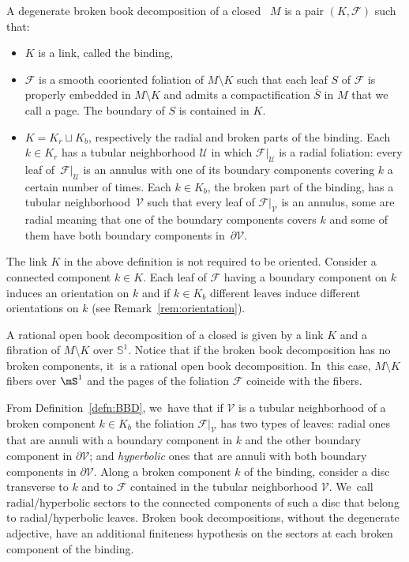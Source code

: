 \begin{defi}\label{defn:BBD}
A degenerate broken book decomposition of a closed \threemanifold~$M$ is a pair $(K,\mathcal{F})$ such that:
\begin{itemize}
\item
$K$ is a link, called the binding,
\item
$\mathcal{F}$ is a smooth cooriented foliation of $M\setminus K$ such that each leaf $S$ of $\mathcal{F}$ is properly embedded in $M\setminus K$ and admits a compactification $\overline{S}$ in $M$ that we call a page. The boundary of $S$ is contained in $K$.
\item
$K=K_r\sqcup K_b$, respectively the radial and broken parts of the binding. Each $k\in K_r$ has a tubular neighborhood $\mathcal{U}$ in which $\mathcal{F}|_{\mathcal U}$ is a radial foliation: every leaf of~$\mathcal{F}|_{\mathcal U}$ is an annulus with one of its boundary components covering $k$ a certain number of times. Each $k\in K_b$, the broken part of the binding, has a tubular neighborhood~$\mathcal{V}$ such that every leaf of $\mathcal{F}|_{\mathcal{V}}$ is an annulus, some are radial meaning that one of the boundary components covers $k$ and some of them have both boundary components in~$\partial \mathcal{V}$.
\end{itemize}
\end{defi}

The link $K$ in the above definition is not required to be oriented. Consider a connected component $k\in K$. Each leaf of $\mathcal{F}$ having a boundary component on $k$ induces an orientation on $k$ and if $k\in K_b$ different leaves induce different orientations on $k$ (see Remark~\ref{rem:orientation}).

A rational open book decomposition of a closed \threemanifold is given by a link $K$ and a fibration of $M\setminus K$ over $\mathbb{S}^1$. Notice that if the broken book decomposition has no broken components, it~is a rational open book decomposition. In~this case, $M\setminus K$ fibers over $\mS^1$ and the pages of the foliation $\mathcal{F}$ coincide with the fibers.

From Definition~\ref{defn:BBD}, we~have that if $\mathcal{V}$ is a tubular neighborhood of a broken component $k\in K_b$ the foliation $\mathcal{F}|_{\mathcal{V}}$ has two types of leaves: radial ones that are annuli with a boundary component in $k$ and the other boundary component in $\partial {\mathcal{V}}$; and \emph{hyperbolic} ones that are annuli with both boundary components in $\partial {\mathcal{V}}$.
Along a broken component $k$ of the binding, consider a disc transverse to $k$ and to $\mathcal{F}$ contained in the tubular neighborhood $\mathcal V$. We~call radial/hyperbolic sectors to the connected components of such a disc that belong to radial/hyperbolic leaves. Broken book decompositions, without the degenerate adjective, have an additional finiteness hypothesis on the sectors at each broken component of the binding.

